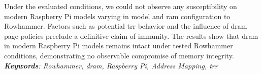 \begin{titlepage}
        Under the evaluated conditions, we could not observe any susceptibility 
        on modern Raspberry Pi models varying in model and ram configuration to 
        Rowhammer. Factors such as potential \gls{trr} behavior and the 
        influence of \gls{dram} page policies preclude a definitive claim of immunity.
        The results show that \gls{dram} in modern Raspberry Pi models remains intact 
        under tested Rowhammer conditions, demonstrating no observable compromise 
        of memory integrity.
        \\
        \textit{\textbf{Keywords}: Rowhammer, \gls{dram}, Raspberry Pi, Address Mapping, \gls{trr}}

\end{titlepage}
